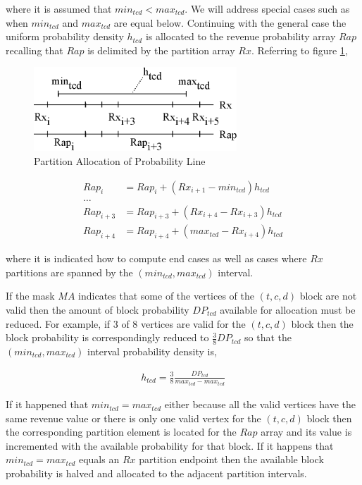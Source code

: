 where it is assumed that $min_{tcd} < max_{tcd}$. We will address special cases such as when $min_{tcd}$ and $max_{tcd}$ are equal below. Continuing with the general case the uniform probability density $h_{tcd}$ is allocated to the revenue probability array $Rap$ recalling that $Rap$ is delimited by the partition array $Rx$. Referring to figure \ref{fig:line_projection},

\begin{figure}
  \centering
  \includegraphics[width=3in]{Images/line_projection}
  \caption[Partition Allocation of Probability Line]
          {Partition Allocation of Probability Line}
  \label{fig:line_projection}
\end{figure}

\begin{align*}
Rap_i &= Rap_i + (Rx_{i+1} - min_{tcd}) h_{tcd}\\
\dots\\
Rap_{i+3} &= Rap_{i+3} + (Rx_{i+4} - Rx_{i+3}) h_{tcd}\\
Rap_{i+4} &= Rap_{i+4} + (max_{tcd} - Rx_{i+4}) h_{tcd} 
\end{align*}

where it is indicated how to compute end cases as well as cases where $Rx$ partitions are spanned by the $(min_{tcd}, max_{tcd})$ interval. 

If the mask $MA$ indicates that some of the vertices of the $(t,c,d)$ block are not valid then the amount of block probability $DP_{tcd}$ available for allocation must be reduced. For example, if $3$ of $8$ vertices are valid for the $(t,c,d)$ block then the block probability is correspondingly reduced to $\frac{3}{8}DP_{tcd}$ so that the $(min_{tcd}, max_{tcd})$ interval probability density is,

\begin{align*}
h_{tcd} = \frac{3}{8}\frac{DP_{tcd}}{max_{tcd} - max_{tcd}}
\end{align*}

If it happened that $min_{tcd} = max_{tcd}$ either because all the valid vertices have the same revenue value or there is only one valid vertex for the $(t,c,d)$ block then the corresponding partition element is located for the $Rap$ array and its value is incremented with the available probability for that block. If it happens that $min_{tcd} = max_{tcd}$ equals an $Rx$ partition endpoint then the available block probability is halved and allocated to the adjacent partition intervals.

